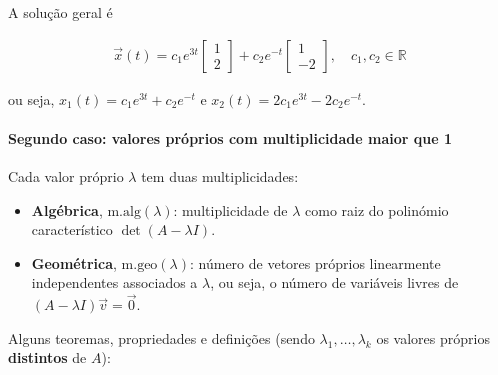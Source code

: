 \documentclass{article}
\begin{document}
A solução geral é

\begin{gather*}
\boxed{\vec{x}(t) =
c_1 e^{3t}
\begin{bmatrix}
1 \\
2
\end{bmatrix}
+ c_2 e^{-t}
\begin{bmatrix}
1 \\
-2
\end{bmatrix},
\quad c_1, c_2 \in \mathbb{R}}
\end{gather*}

ou seja, $x_1(t) = c_1 e^{3t} + c_2 e^{-t}$ e $x_2(t) = 2c_1 e^{3t} - 2c_2 e^{-t}$.

\paragraph{Segundo caso: valores próprios com multiplicidade maior que 1}

Cada valor próprio $\lambda$ tem duas multiplicidades:

\begin{itemize}
    \item \textbf{Algébrica}, $\text{m.alg}(\lambda)$: multiplicidade de $\lambda$ como raiz do
    polinómio característico $\det(A - \lambda I)$.
    \item \textbf{Geométrica}, $\text{m.geo}(\lambda)$: número de vetores próprios linearmente
    independentes associados a $\lambda$, ou seja, o número de variáveis livres de
    $(A - \lambda I)\vec{v} = \vec{0}$.
\end{itemize}

Alguns teoremas, propriedades e definições (sendo $\lambda_1, \ldots, \lambda_k$ os valores próprios
\textbf{distintos} de $A$):
\end{document}
